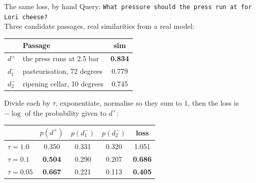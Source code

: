 \documentclass[aspectratio=169]{beamer}
\begin{document}
\begin{frame}{The same loss, by hand}
  \vspace{0.4em}
  Query: \texttt{What pressure should the press run at for Lori cheese?}\\
  Three candidate passages, real similarities from a real model:

  \vspace{0.5em}
  \begin{center}
  \small
  \begin{tabular}{llc}
    \toprule
    & \textbf{Passage} & \textbf{sim} \\
    \midrule
    $d^{+}$   & the press runs at 2.5 bar   & \textbf{0.834} \\
    $d_1^{-}$ & pasteurisation, 72 degrees  & 0.779 \\
    $d_2^{-}$ & ripening cellar, 10 degrees & 0.745 \\
    \bottomrule
  \end{tabular}
  \end{center}

  \vspace{0.4em}
  Divide each by $\tau$, exponentiate, normalise so they sum to 1, then the loss is
  $-\log$ of the probability given to $d^{+}$:

  \vspace{0.4em}
  \begin{center}
  \small
  \begin{tabular}{lccc|c}
    \toprule
    & $p(d^{+})$ & $p(d_1^{-})$ & $p(d_2^{-})$ & \textbf{loss} \\
    \midrule
    $\tau = 1.0$  & 0.350 & 0.331 & 0.320 & 1.051 \\
    $\tau = 0.1$  & \textbf{0.504} & 0.290 & 0.207 & \textbf{0.686} \\
    $\tau = 0.05$ & \textbf{0.667} & 0.221 & 0.113 & \textbf{0.405} \\
    \bottomrule
  \end{tabular}
  \end{center}
\end{frame}
\end{document}
